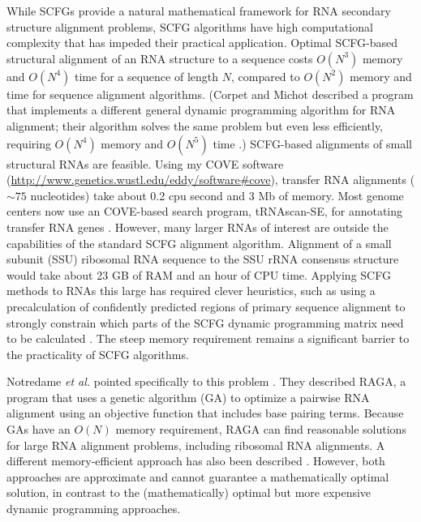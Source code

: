 \documentclass[11pt]{article}
\begin{document}
While SCFGs provide a natural mathematical framework for RNA secondary
structure alignment problems, SCFG algorithms have high computational
complexity that has impeded their practical application. Optimal
SCFG-based structural alignment of an RNA structure to a sequence
costs $O(N^3)$ memory and $O(N^4)$ time for a sequence of length $N$,
compared to $O(N^2)$ memory and time for sequence alignment
algorithms. (Corpet and Michot described a program that implements a
different general dynamic programming algorithm for RNA alignment;
their algorithm solves the same problem but even less efficiently,
requiring $O(N^4)$ memory and $O(N^5)$ time \cite{Corpet94}.)
SCFG-based alignments of small structural RNAs are feasible. Using my
COVE software
(\url{http://www.genetics.wustl.edu/eddy/software#cove}), transfer RNA
alignments ($\sim 75$ nucleotides) take about 0.2 cpu second and 3 Mb
of memory. Most genome centers now use an COVE-based search program,
tRNAscan-SE, for annotating transfer RNA genes
\cite{LoweEddy97}. However, many larger RNAs of interest are outside
the capabilities of the standard SCFG alignment algorithm. Alignment
of a small subunit (SSU) ribosomal RNA sequence to the SSU rRNA
consensus structure would take about 23 GB of RAM and an hour of CPU
time. Applying SCFG methods to RNAs this large has required clever
heuristics, such as using a precalculation of confidently predicted
regions of primary sequence alignment to strongly constrain which
parts of the SCFG dynamic programming matrix need to be calculated
\cite{Brown00}. The steep memory requirement remains a significant
barrier to the practicality of SCFG algorithms.

Notredame \emph{et al.} pointed specifically to this problem
\cite{Notredame97}.  They described RAGA, a program that uses a
genetic algorithm (GA) to optimize a pairwise RNA alignment using an
objective function that includes base pairing terms. Because GAs have
an $O(N)$ memory requirement, RAGA can find reasonable solutions for
large RNA alignment problems, including ribosomal RNA alignments. A
different memory-efficient approach has also been described
\cite{Lenhof98,LenhofVingron98}. However, both approaches are
approximate and cannot guarantee a mathematically optimal solution, in
contrast to the (mathematically) optimal but more expensive dynamic
programming approaches.
\end{document}
